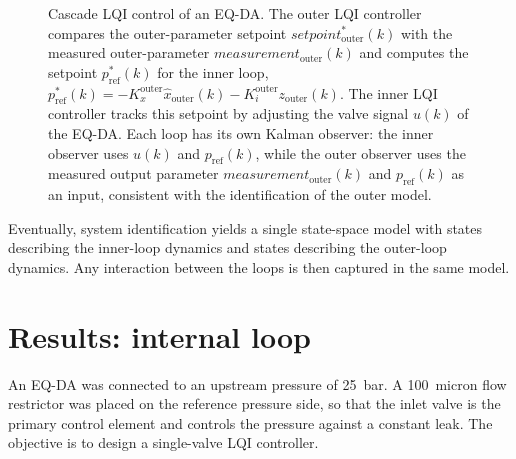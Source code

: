 \documentclass[12pt,a4paper]{article}
\begin{document}
\begin{figure}[ht]
{
    }%
    \caption{Cascade LQI control of an EQ-DA. The outer LQI controller
    compares the outer-parameter setpoint $setpoint_{\mathrm{outer}}^{\ast}(k)$ with the
    measured outer-parameter $measurement_{\mathrm{outer}}(k)$ and computes the setpoint
    $p_{\mathrm{ref}}^{\ast}(k)$ for the inner loop,
    $p_{\mathrm{ref}}^{\ast}(k) = -K_x^{\mathrm{outer}}\hat{x}_{\mathrm{outer}}(k) - K_i^{\mathrm{outer}} z_{\mathrm{outer}}(k)$.
    The inner LQI controller tracks this setpoint by adjusting the
    valve signal $u(k)$ of the EQ-DA. Each loop has its own Kalman observer: the
    inner observer uses $u(k)$ and $p_{\mathrm{ref}}(k)$, while the outer observer
    uses the measured output parameter $measurement_{\mathrm{outer}}(k)$ and
    $p_{\mathrm{ref}}(k)$ as an input, consistent with the identification of the
    outer model.}
    \label{fig:cascade_lqi}
\end{figure}

Eventually, system identification yields a single state-space model with states describing the inner-loop dynamics and states describing the outer-loop dynamics. Any interaction between the loops is then captured in the same model.

\newpage
\section{Results: internal loop}
\label{sec:internal_loop}
An EQ-DA was connected to an upstream pressure of 25~bar. A 100~micron flow restrictor was placed on the reference pressure side, so that the inlet valve is the primary control element and controls the pressure against a constant leak. The objective is to design a single-valve LQI controller.
\end{document}
